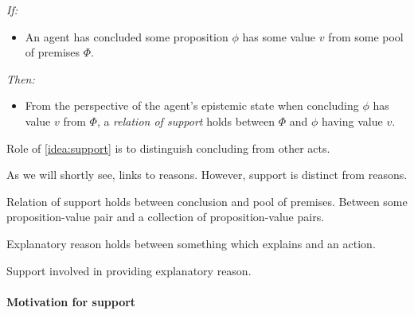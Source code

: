 \begin{note}
  \begin{idea}[Support]
    \label{idea:support}
    \emph{If:}
    \begin{itemize}
    \item
      An agent has concluded some proposition \(\phi\) has some value \(v\) from some pool of premises \(\Phi\).
    \end{itemize}
    \emph{Then:}
    \begin{itemize}
    \item
      From the perspective of the agent's epistemic state when concluding \(\phi\) has value \(v\) from \(\Phi\), a \emph{relation of support} holds between \(\Phi\) and \(\phi\) having value \(v\).
    \end{itemize}
    \vspace{-\baselineskip}
  \end{idea}

  Role of \autoref{idea:support} is to distinguish concluding from other acts.
\end{note}

\begin{note}
  As we will shortly see, links to reasons.
  However, support is distinct from reasons.

  Relation of support holds between conclusion and pool of premises.
  Between some proposition-value pair and a collection of proposition-value pairs.

  Explanatory reason holds between something which explains and an action.

  Support involved in providing explanatory reason.
\end{note}

\paragraph{Motivation for support}

